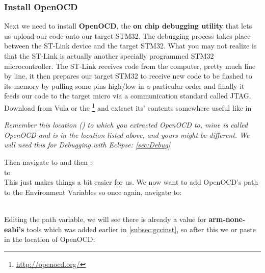 \subsubsection{Install OpenOCD}
\label{Inst:OpenOCD}
Next we need to install \textbf{\color{Brown} OpenOCD}, the \textbf{on chip debugging utility} that lets us upload our code onto our target STM32. The debugging process takes place between the ST-Link device and the target STM32. What you may not realize is that the ST-Link is actually another specially programmed STM32 microcontroller. The  ST-Link receives code from the computer, pretty much line by line, it then prepares our target STM32 to receive new code to be flashed to its memory by pulling some pins high/low in a particular order and finally it feeds our code to the target micro via a communication standard called JTAG.
\\
Download \href{https://vula.uct.ac.za/x/sRNwF6}{\color{Blue}\underline{}} from Vula or the \href{http://openocd.org/}{\color{Blue}\underline{}}\hspace{1pt}\footnote{\url{http://openocd.org/}} and extract its' contents somewhere useful like in 
\parindent=0pt
\par
\emph{\color{Gray} Remember this location () to which you extracted OpenOCD to, mine is called OpenOCD and is in the location listed above, and yours might be different. We will need this for Debugging with Eclipse: \ref{sec:Debug}}
\par
Then navigate to  and then :
\\
 to 
\\
This just makes things a bit easier for us. We now want to add OpenOCD's path to the Environment Variables so once again, navigate to:\\
\-\ \hspace{20pt} 
\par
Editing the path variable, we will see there is already a value for \textbf{arm-none-eabi's} tools which was added earlier in \ref{subsec:gccinst}, so after this we \underline{} or paste in the location of OpenOCD:
\par
{}
